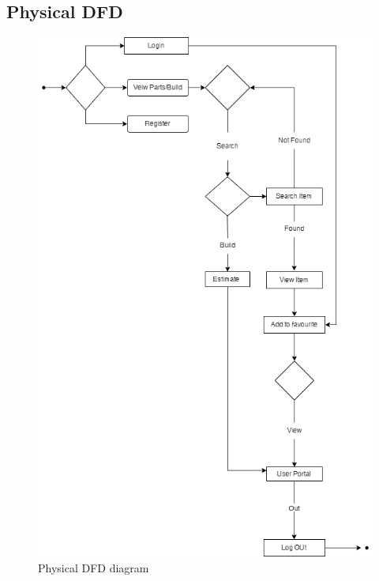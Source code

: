       \subsection{Physical DFD}
      \begin{figure}[H]
         \includegraphics[width=15cm]{Diagrams/physicaldfd.png}
         \caption{Physical DFD diagram}
         \end{figure}
  


      